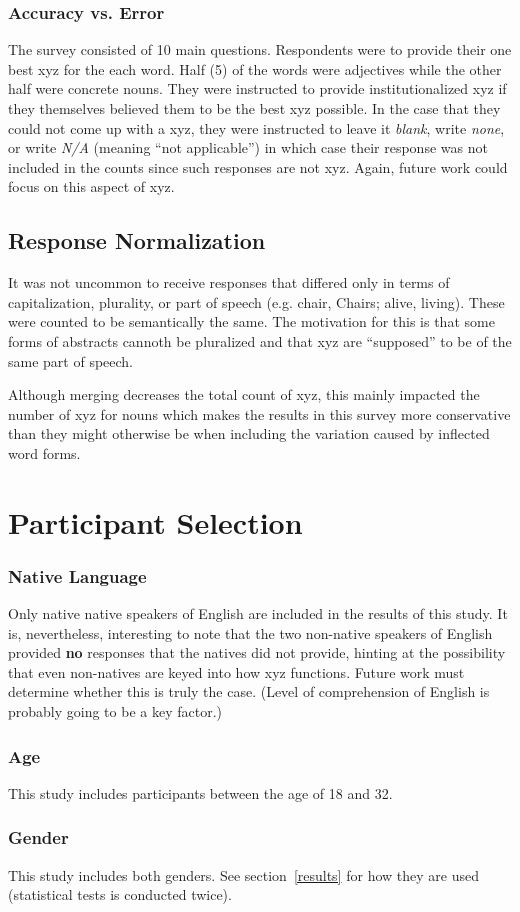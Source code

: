 \subsubsection{Accuracy vs. Error}
The survey consisted of 10 main questions.  Respondents were to provide their one best xyz for the each word. Half (5) of the words were adjectives while the other half were concrete nouns.  They were instructed to provide institutionalized xyz if they themselves believed them to be the best xyz possible. In the case that they could not come up with a xyz, they were instructed to leave it \textit{blank}, write \textit{none}, or write \textit{N/A} (meaning ``not applicable'') in which case their response was not included in the counts since such responses are not xyz.  Again, future work could focus on this aspect of xyz.  

\subsection{Response Normalization} It was not uncommon to receive responses that differed only in terms of capitalization, plurality, or part of speech (e.g. chair, Chairs; alive, living).  These were counted to be semantically the same.  The motivation for this is that some forms of abstracts cannoth be pluralized and that xyz are ``supposed'' to be of the same part of speech.

Although merging decreases the total count of xyz, this mainly impacted the number of xyz for nouns which makes the results in this survey more conservative than they might otherwise be when including the variation caused by inflected word forms.  


\section{Participant Selection}
\subsubsection{Native Language}
Only native native speakers of English are included in the results of this study. It is, nevertheless, interesting to note that the two non-native speakers of English provided \textbf{no} responses that the natives did not provide, hinting at the possibility that even non-natives are keyed into how xyz functions.  Future work must determine whether this is truly the case. (Level of comprehension of English is probably going to be a key factor.)

\subsubsection{Age}
This study includes participants between the age of 18 and 32.

\subsubsection{Gender}
This study includes both genders.  See section~\ref{results} for how they are used (statistical tests is conducted twice).  